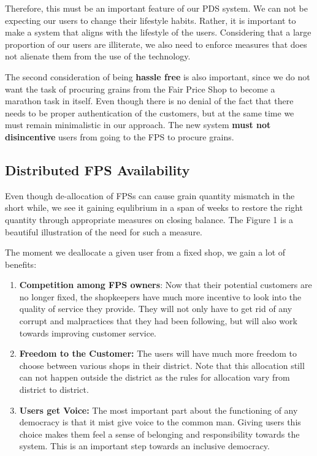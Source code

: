 \documentclass[a4paper,12pt]{extarticle}
\begin{document}
Therefore, this must be an important feature of our PDS system. We can not be expecting our users to change their lifestyle habits. Rather, it is important to make a system that aligns with the lifestyle of the users. Considering that a large proportion of our users are illiterate, we also need to enforce measures that does not alienate them from the use of the technology.

The second consideration of being\textbf{ hassle free }is also important, since we do not want the task of procuring grains from the Fair Price Shop to become a marathon task in itself. Even though there is no denial of the fact that there needs to be proper authentication of the customers, but at the same time we must remain minimalistic in our approach. The new system \textbf{must not} \textbf{disincentive} users from going to the FPS to procure grains.

\subsection{Distributed FPS Availability}

Even though de-allocation of FPSs can cause grain quantity mismatch in the short while, we see it gaining equlibrium in a span of weeks to restore the right quantity through appropriate measures on closing balance.
The Figure 1 is a beautiful illustration of the need for such a measure. 

The moment we deallocate a given user from a fixed shop, we gain a lot of benefits:
\begin{enumerate}
\item  \textbf{Competition among FPS owners}: Now that their potential customers are no longer fixed, the shopkeepers have much more incentive to look into the quality of service they provide. They will not only have to get rid of any corrupt and malpractices that they had been following, but will also work towards improving customer service.
\item \textbf{Freedom to the Customer:} The users will have much more freedom to choose between various shops in their district. Note that this allocation still can not happen outside the district as the rules for allocation vary from district to district.
\item \textbf{Users get Voice:} The most important part about the functioning of any democracy is that it mist give voice to the common man. Giving users this choice makes them feel a sense of belonging and responsibility towards the system. This is an important step towards an inclusive democracy.
\end{enumerate}
\end{document}
